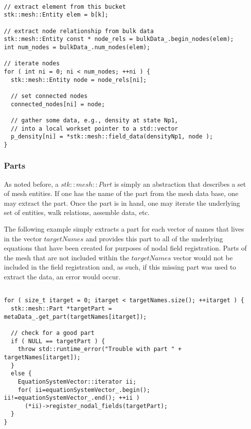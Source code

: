 \begin{lstlisting}

// extract element from this bucket
stk::mesh::Entity elem = b[k];

// extract node relationship from bulk data
stk::mesh::Entity const * node_rels = bulkData_.begin_nodes(elem);
int num_nodes = bulkData_.num_nodes(elem);

// iterate nodes
for ( int ni = 0; ni < num_nodes; ++ni ) {
  stk::mesh::Entity node = node_rels[ni];
  
  // set connected nodes
  connected_nodes[ni] = node;
  
  // gather some data, e.g., density at state Np1, 
  // into a local workset pointer to a std::vector
  p_density[ni] = *stk::mesh::field_data(densityNp1, node );
}

\end{lstlisting}

\subsubsection{Parts}
As noted before, a $stk::mesh::Part$ is simply an abstraction that describes a 
set of mesh entities. If one has the name of the part from the mesh data base,
one may extract the part. Once the part is in hand, one may iterate the underlying set of
entities, walk relations, assemble data, etc.

The following example simply extracts a part for each vector of names that lives in
the vector $targetNames$ and provides this part to all of the underlying equations
that have been created for purposes of nodal field registration. Parts of the mesh
that are not included within the $targetNames$ vector would not be included in the 
field registration and, as such, if this missing part was used to extract the data, an 
error would occur.

\begin{lstlisting}

for ( size_t itarget = 0; itarget < targetNames.size(); ++itarget ) {
  stk::mesh::Part *targetPart = metaData_.get_part(targetNames[itarget]);

  // check for a good part
  if ( NULL == targetPart ) {
    throw std::runtime_error("Trouble with part " + targetNames[itarget]);
  }
  else {
    EquationSystemVector::iterator ii;
    for( ii=equationSystemVector_.begin(); ii!=equationSystemVector_.end(); ++ii )
      (*ii)->register_nodal_fields(targetPart);
  }
}

\end{lstlisting}


